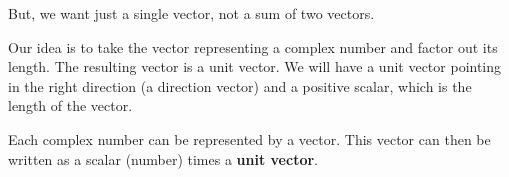 \documentclass{ximera}
\begin{document}
\begin{example}
\begin{image}
\end{image}


\end{example}



But, we want just a single vector, not a sum of two vectors. 

Our idea is to take the vector representing a complex number and factor out its length. The resulting vector is a unit vector. We will have a unit vector pointing in the right direction (a direction vector) and a positive scalar, which is the length of the vector.


Each complex number can be represented by a vector.  This vector can then be written as a scalar (number) times a \textbf{unit vector}.  
\end{document}

